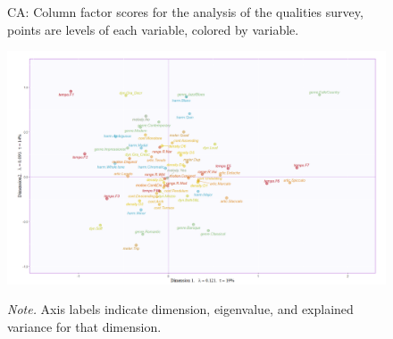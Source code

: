 \documentclass[
]{article}
\begin{document}
\begin{figure}   
  \centering  
  \caption{CA: Column factor scores for the analysis of the qualities survey, points are levels of each variable, colored by variable.}
    \includegraphics{./supmatsimgs/qfactormapsjall.png}
  \label{fig:qjmapsall}
  \caption*{\footnotesize \textit{Note.} Axis labels indicate dimension, eigenvalue, and explained variance for that dimension.}
\end{figure}
\end{document}
